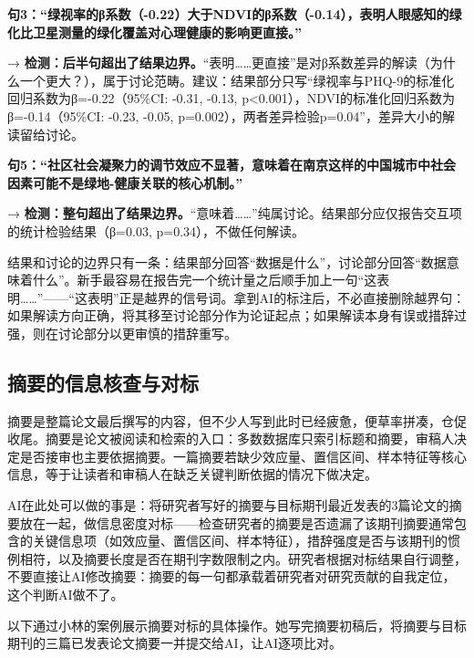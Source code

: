 \begin{aibox}
\textbf{句3：``绿视率的β系数（-0.22）大于NDVI的β系数（-0.14），表明人眼感知的绿化比卫星测量的绿化覆盖对心理健康的影响更直接。''}

→ \textbf{检测：后半句超出了结果边界。}``表明……更直接''是对β系数差异的解读（为什么一个更大？），属于讨论范畴。建议：结果部分只写``绿视率与PHQ-9的标准化回归系数为β=-0.22（95\%CI: -0.31, -0.13, p<0.001），NDVI的标准化回归系数为β=-0.14（95\%CI: -0.23, -0.05, p=0.002），两者差异检验p=0.04''，差异大小的解读留给讨论。

\textbf{句5：``社区社会凝聚力的调节效应不显著，意味着在南京这样的中国城市中社会因素可能不是绿地-健康关联的核心机制。''}

→ \textbf{检测：整句超出了结果边界。}``意味着……''纯属讨论。结果部分应仅报告交互项的统计检验结果（β=0.03, p=0.34），不做任何解读。
\end{aibox}

\begin{critiquebox}
结果和讨论的边界只有一条：结果部分回答``数据是什么''，讨论部分回答``数据意味着什么''。新手最容易在报告完一个统计量之后顺手加上一句``这表明……''——``这表明''正是越界的信号词。拿到AI的标注后，不必直接删除越界句：如果解读方向正确，将其移至讨论部分作为论证起点；如果解读本身有误或措辞过强，则在讨论部分以更审慎的措辞重写。
\end{critiquebox}

\medskip

\subsection{摘要的信息核查与对标}

摘要是整篇论文最后撰写的内容，但不少人写到此时已经疲惫，便草率拼凑，仓促收尾。摘要是论文被阅读和检索的入口：多数数据库只索引标题和摘要，审稿人决定是否接审也主要依据摘要。一篇摘要若缺少效应量、置信区间、样本特征等核心信息，等于让读者和审稿人在缺乏关键判断依据的情况下做决定。

AI在此处可以做的事是：将研究者写好的摘要与目标期刊最近发表的3篇论文的摘要放在一起，做信息密度对标——检查研究者的摘要是否遗漏了该期刊摘要通常包含的关键信息项（如效应量、置信区间、样本特征），措辞强度是否与该期刊的惯例相符，以及摘要长度是否在期刊字数限制之内。研究者根据对标结果自行调整，不要直接让AI修改摘要：摘要的每一句都承载着研究者对研究贡献的自我定位，这个判断AI做不了。

以下通过小林的案例展示摘要对标的具体操作。她写完摘要初稿后，将摘要与目标期刊的三篇已发表论文摘要一并提交给AI，让AI逐项比对。

